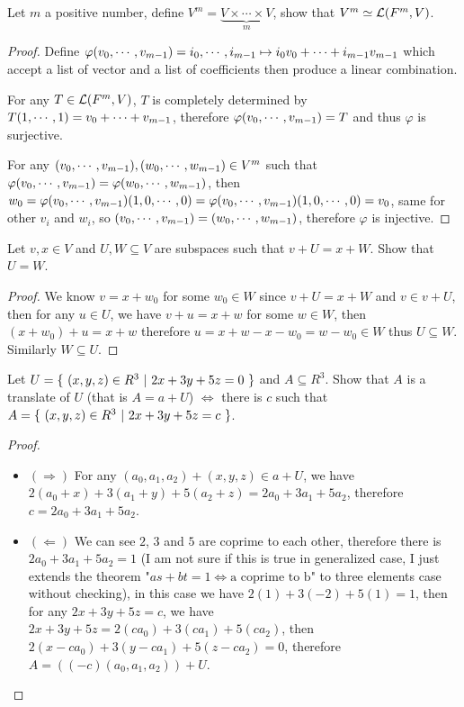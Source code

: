 \documentclass[../main.tex]{subfiles}
\begin{document}
\setcounter{exercise}{4}
\begin{exercise}
  Let $m$ a positive number, define $V^m = \underbrace{V \times \cdots \times V}_{m}$,
  show that $V^m \simeq \LT(F^m, V)$.
\end{exercise}
\begin{proof}
  Define $\varphi(\join{v}{m -  1}) = \join{i}{m - 1} \mapsto \joinp[+]{i}{v}{m - 1}$
  which accept a list of vector and a list of coefficients then produce a linear combination.

  For any $T \in \LT(F^m, V)$, $T$ is completely determined by $T(1, \cdots, 1) = \join[+]{v}{m - 1}$,
  therefore $\varphi(\join{v}{m - 1}) = T$ and thus $\varphi$ is surjective.

  For any $(\join{v}{m - 1}), (\join{w}{m - 1}) \in V^m$ such that $\varphi(\join{v}{m - 1}) = \varphi(\join{w}{m - 1})$,
  then $w_0 = \varphi(\join{v}{m - 1})(1, 0, \cdots, 0) = \varphi(\join{v}{m - 1})(1, 0, \cdots, 0) = v_0$,
  same for other $v_i$ and $w_i$, so $(\join{v}{m - 1}) = (\join{w}{m - 1})$,
  therefore $\varphi$ is injective.
\end{proof}

\begin{exercise}
  Let $v, x \in V$ and $U, W \subseteq V$ are subspaces such that $v + U = x + W$.
  Show that $U = W$.
\end{exercise}
\begin{proof}
  We know $v = x + w_0$ for some $w_0 \in W$ since $v + U = x + W$ and $v \in v + U$,
  then for any $u \in U$, we have $v + u = x + w$ for some $w \in W$,
  then $(x + w_0) + u = x + w$ therefore $u = x + w - x - w_0 = w - w_0 \in W$
  thus $U \subseteq W$.
  Similarly $W \subseteq U$.
\end{proof}

\begin{exercise}
  Let $U = \set{(x, y, z) \in R^3}{2x + 3y + 5z = 0}$ and $A \subseteq R^3$.
  Show that $A$ is a translate of $U$ (that is $A = a + U$) $\iff$
  there is $c$ such that $A = \set{(x, y, z) \in R^3}{2x + 3y + 5z = c}$.
\end{exercise}
\begin{proof}
  ~
  \begin{itemize}
    \item $(\Rightarrow)$ For any $(a_0, a_1, a_2) + (x, y, z) \in a + U$,
          we have $2(a_0 + x) + 3(a_1 + y) + 5(a_2 + z) = 2a_0 + 3a_1 + 5a_2$,
          therefore $c = 2a_0 + 3a_1 + 5a_2$.
    \item $(\Leftarrow)$ We can see $2$, $3$ and $5$ are coprime to each other,
          therefore there is $2a_0 + 3a_1 + 5a_2 = 1$ (I am not sure if this is true
          in generalized case, I just extends the theorem "$as + bt = 1 \iff \text{a coprime to b}$" to three elements case without checking),
          in this case we have $2(1) + 3(-2) + 5(1) = 1$,
          then for any $2x + 3y + 5z = c$, we have $2x + 3y + 5z = 2(ca_0) + 3(ca_1) + 5(ca_2)$,
          then $2(x - ca_0) + 3(y - ca_1) + 5(z - ca_2) = 0$,
          therefore $A = ((-c) (a_0, a_1, a_2)) + U$.
  \end{itemize}
\end{proof}
\end{document}
